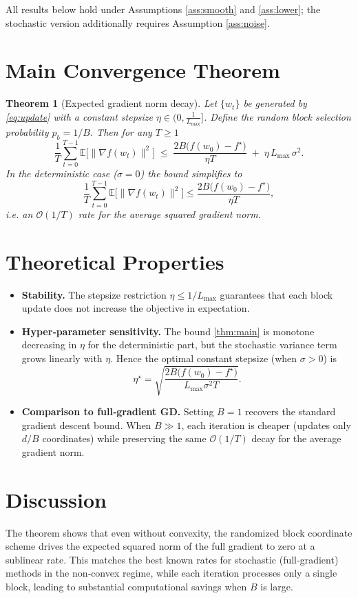 \documentclass[11pt]{article}
\newcommand{\EE}{\mathbb{E}}
\newcommand{\grad}{\nabla}
\newtheorem{theorem}{Theorem}
\begin{document}
All results below hold under Assumptions \ref{ass:smooth} and \ref{ass:lower};
the stochastic version additionally requires Assumption \ref{ass:noise}.

\section*{Main Convergence Theorem}
\begin{theorem}[Expected gradient norm decay]
\label{thm:main}
Let $\{w_t\}$ be generated by \eqref{eq:update} with a constant stepsize
$\eta\in\big(0,\frac{1}{L_{\max}}\big]$.
Define the random block selection probability $p_b=1/B$.
Then for any $T\ge1$
\[
\frac{1}{T}\sum_{t=0}^{T-1}\EE\!\big[\|\grad f(w_t)\|^2\big]
\;\le\;
\frac{2B\big(f(w_0)-f^\star\big)}{\eta T}
\;+\;
\eta\,L_{\max}\,\sigma^2 .
\tag{1}
\]
In the deterministic case ($\sigma=0$) the bound simplifies to
\[
\frac{1}{T}\sum_{t=0}^{T-1}\EE\!\big[\|\grad f(w_t)\|^2\big]
\le \frac{2B\big(f(w_0)-f^\star\big)}{\eta T},
\]
i.e. an $\mathcal{O}(1/T)$ rate for the average squared gradient norm.
\end{theorem}

\section*{Theoretical Properties}
\begin{itemize}
\item \textbf{Stability.} The stepsize restriction $\eta\le 1/L_{\max}$ guarantees that each block update does not increase the objective in expectation.
\item \textbf{Hyper‑parameter sensitivity.} The bound \eqref{thm:main} is monotone decreasing in $\eta$ for the deterministic part, but the stochastic variance term grows linearly with $\eta$. Hence the optimal constant stepsize (when $\sigma>0$) is
\[
\eta^\star = \sqrt{\frac{2B\big(f(w_0)-f^\star\big)}{L_{\max}\sigma^2 T}} .
\]
\item \textbf{Comparison to full‑gradient GD.} Setting $B=1$ recovers the standard gradient descent bound. When $B\gg1$, each iteration is cheaper (updates only $d/B$ coordinates) while preserving the same $\mathcal{O}(1/T)$ decay for the average gradient norm.
\end{itemize}

\section*{Discussion}
The theorem shows that even without convexity, the randomized block
coordinate scheme drives the expected squared norm of the full gradient to zero at a sublinear rate.  This matches the best known rates for stochastic (full‑gradient) methods in the non‑convex regime, while each iteration processes only a single block, leading to substantial computational savings when $B$ is large.
\end{document}

